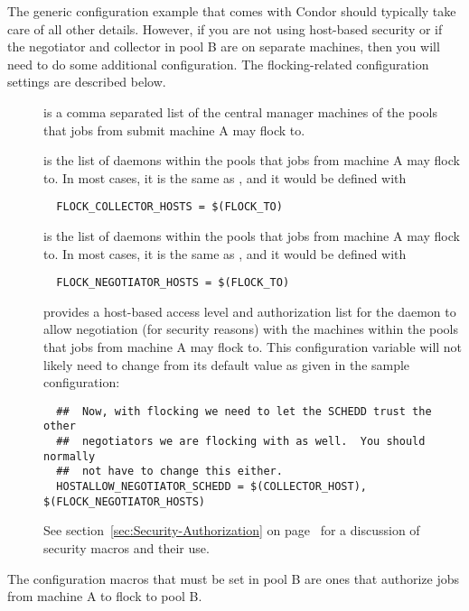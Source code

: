The generic configuration example that comes with Condor should
typically take care of all other details.  However, if you are not
using host-based security or if the negotiator and collector in pool B
are on separate machines, then you will need to do some additional
configuration.  The flocking-related configuration settings are
described below.

\begin{description}
  \item[] is a comma separated list of the central
  manager machines of the pools that jobs from submit machine A may flock to.
  \item[]
  is the list of  daemons within the pools
  that jobs from machine A may flock to.
  In most cases, it is the same as , and
  it would be defined with 
  \begin{verbatim}
  FLOCK_COLLECTOR_HOSTS = $(FLOCK_TO)
  \end{verbatim}
  \item[]
  is the list of  daemons within the pools
  that jobs from machine A may flock to.
  In most cases, it is the same as , and
  it would be defined with 
  \begin{verbatim}
  FLOCK_NEGOTIATOR_HOSTS = $(FLOCK_TO)
  \end{verbatim}
  \item[]
  provides a host-based access level and authorization list for the
   daemon to allow negotiation (for security
  reasons) with the machines within the pools
  that jobs from machine A may flock to.
  This configuration variable will not likely need to change
  from its default value as given in the sample configuration:
  \footnotesize
  \begin{verbatim}
  ##  Now, with flocking we need to let the SCHEDD trust the other
  ##  negotiators we are flocking with as well.  You should normally
  ##  not have to change this either.
  HOSTALLOW_NEGOTIATOR_SCHEDD = $(COLLECTOR_HOST), $(FLOCK_NEGOTIATOR_HOSTS)
  \end{verbatim}
  \normalsize
  See 
  section~\ref{sec:Security-Authorization} on
  page~\pageref{sec:Security-Authorization} for a discussion
  of security macros and their use.
\end{description}

The configuration macros that must be set in 
pool B are ones that authorize jobs from machine A
to flock to pool B.

